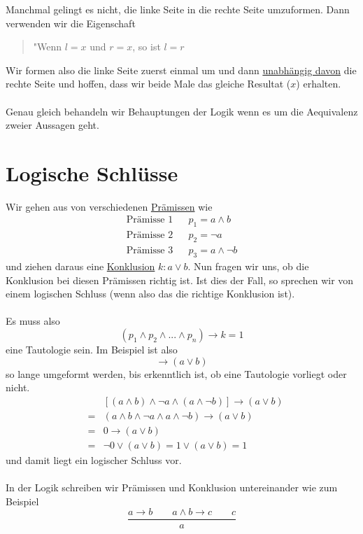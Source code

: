 \documentclass{report}
\begin{document}
Manchmal gelingt es nicht, die linke Seite in die rechte Seite umzuformen. Dann verwenden wir die Eigenschaft
\begin{quote}"Wenn $l=x$ und $r=x$, so ist $l=r$\end{quote}
Wir formen also die linke Seite zuerst einmal um und dann \underline{unabhängig davon} die rechte Seite und hoffen, dass wir beide Male das gleiche Resultat ($x$) erhalten.\\\\
Genau gleich behandeln wir Behauptungen der Logik wenn es um die Aequivalenz zweier Aussagen geht.

\section{Logische Schlüsse}
Wir gehen aus von verschiedenen \underline{Prämissen} wie
\begin{eqnarray}\mbox{Prämisse 1} & & p_1 = a \land b \nonumber \\
\mbox{Prämisse 2}& & p_2 = \lnot a \nonumber \\
\mbox{Prämisse 3}& & p_3 = a \land \lnot b\end{eqnarray}
und ziehen daraus eine \underline{Konklusion} $k : a \lor b$. Nun fragen wir uns, ob die Konklusion bei diesen Prämissen richtig ist. Ist dies der Fall, so sprechen wir von einem logischen Schluss (wenn also das die richtige Konklusion ist).
\\\\Es muss also
\begin{equation}(p_1 \land p_2 \land ... \land p_n) \to k = 1\end{equation}
eine Tautologie sein. Im Beispiel ist also
\begin{equation}[(a \land b) \land \lnot a \land (a \land \lnot b)] \to (a \lor b)\end{equation}
so lange umgeformt werden, bis erkenntlich ist, ob eine Tautologie vorliegt oder nicht.
\begin{eqnarray}& &[(a \land b) \land \lnot a \land (a \land \lnot b)] \to (a \lor b) \nonumber \\
&=&(a \land b \land \lnot a \land a \land \lnot b) \to (a \lor b) \nonumber \\
&=&0 \to (a \lor b) \nonumber \\
&=&\lnot 0 \lor (a \lor b) = 1 \lor (a \lor b) = 1\end{eqnarray}
und damit liegt ein logischer Schluss vor.\\\\
In der Logik schreiben wir Prämissen und Konklusion untereinander wie zum Beispiel
\begin{equation}\frac{a \to b \quad\quad a \land b \to c \quad\quad c}{a}\end{equation}
\end{document}
